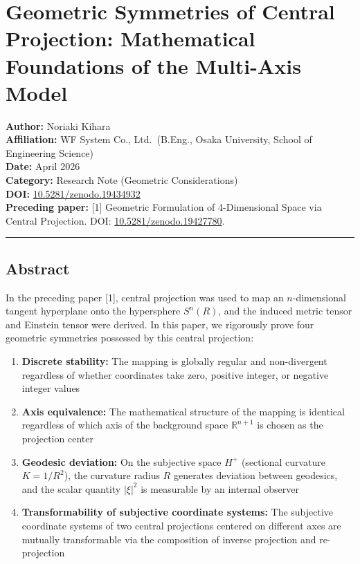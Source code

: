 \documentclass[a4paper,11pt]{article}
\theoremstyle{definition}
\providecommand{\tightlist}{\setlength{\itemsep}{0pt}\setlength{\parskip}{0pt}}
\begin{document}
\section{Geometric Symmetries of Central Projection: Mathematical Foundations of the Multi-Axis Model}\label{geometric-symmetries-of-central-projection-mathematical-foundations-of-the-multi-axis-model}

\textbf{Author:} Noriaki Kihara\\
\textbf{Affiliation:} WF System Co., Ltd.~(B.Eng., Osaka University, School of Engineering Science)\\
\textbf{Date:} April 2026\\
\textbf{Category:} Research Note (Geometric Considerations)\\
\textbf{DOI:} \href{https://doi.org/10.5281/zenodo.19434932}{10.5281/zenodo.19434932}\\
\textbf{Preceding paper:} {[}1{]} Geometric Formulation of 4-Dimensional Space via Central Projection. DOI: \href{https://doi.org/10.5281/zenodo.19427780}{10.5281/zenodo.19427780}.

\begin{center}\rule{0.5\linewidth}{0.5pt}\end{center}

\subsection{Abstract}\label{abstract}

In the preceding paper {[}1{]}, central projection was used to map an \(n\)-dimensional tangent hyperplane onto the hypersphere \(S^n(R)\), and the induced metric tensor and Einstein tensor were derived. In this paper, we rigorously prove four geometric symmetries possessed by this central projection:

\begin{enumerate}
\def\labelenumi{\arabic{enumi}.}
\tightlist
\item
  \textbf{Discrete stability:} The mapping is globally regular and non-divergent regardless of whether coordinates take zero, positive integer, or negative integer values
\item
  \textbf{Axis equivalence:} The mathematical structure of the mapping is identical regardless of which axis of the background space \(\mathbb{R}^{n+1}\) is chosen as the projection center
\item
  \textbf{Geodesic deviation:} On the subjective space \(H^+\) (sectional curvature \(K = 1/R^2\)), the curvature radius \(R\) generates deviation between geodesics, and the scalar quantity \(|\xi|^2\) is measurable by an internal observer
\item
  \textbf{Transformability of subjective coordinate systems:} The subjective coordinate systems of two central projections centered on different axes are mutually transformable via the composition of inverse projection and re-projection
\end{enumerate}
\end{document}
